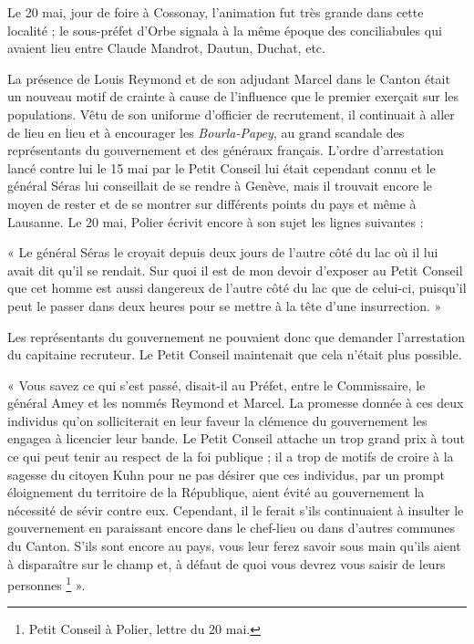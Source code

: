 \documentclass[french,twoside]{book} %
\newenvironment{quoteblock}%
  {\begin{quoting}}
  {\end{quoting}}
\newenvironment{quotebar}{%
    \def\FrameCommand{{\color{rubric!10!}\vrule width 0.5em} \hspace{0.9em}}%
    \def\OuterFrameSep{\itemsep} %
    \MakeFramed {\advance\hsize-\width \FrameRestore}
  }%
  {%
    \endMakeFramed
  }
\renewenvironment{quoteblock}%
  {%
    \savenotes
    \setstretch{0.9}
    \begin{quotebar}
  }
  {%
    \end{quotebar}
    \spewnotes
  }
\begin{document}
\noindent Le 20 mai, jour de foire à Cossonay, l’animation fut très grande dans cette localité ; le sous-préfet d’Orbe signala à la même époque des conciliabules qui avaient lieu entre Claude Mandrot, Dautun, Duchat, etc.\par
La présence de Louis Reymond et de son adjudant Marcel dans le Canton était un nouveau motif de crainte à cause de l’influence que le premier exerçait sur les populations. Vêtu de son uniforme d’officier de recrutement, il continuait à aller de lieu en lieu et à encourager les \emph{Bourla-Papey}, au grand scandale des représentants du gouvernement et des généraux français. L’ordre d’arrestation lancé contre lui le 15 mai par le Petit Conseil lui était cependant connu et le général Séras lui conseillait de se rendre à Genève, mais il trouvait encore le moyen de rester et de se montrer sur différents points du pays et même à Lausanne. Le 20 mai, Polier écrivit encore à son sujet les lignes suivantes :\par

\begin{quoteblock}
 \noindent « Le général Séras le croyait depuis deux jours de l’autre côté du lac où il lui avait dit qu’il se rendait. Sur quoi il est de mon devoir d’exposer au Petit Conseil que cet homme est aussi dangereux de l’autre côté du lac que de celui-ci, puisqu’il peut le passer dans deux heures pour se mettre à la tête d’une insurrection. »
 \end{quoteblock}

\noindent Les représentants du gouvernement ne pouvaient donc que demander l’arrestation du capitaine recruteur. Le Petit Conseil maintenait que cela n’était plus possible.\par

\begin{quoteblock}
 \noindent « Vous savez ce qui s’est passé, disait-il au Préfet, entre le Commissaire, le général Amey et les nommés Reymond et Marcel. La promesse donnée à ces deux individus qu’on solliciterait en leur faveur la clémence du gouvernement les engagea à licencier leur bande. Le Petit Conseil attache un trop grand prix à tout ce qui peut tenir au respect de la foi publique ; il a trop de motifs de croire à la sagesse du citoyen Kuhn pour ne pas désirer que ces individus, par un prompt éloignement du territoire de la République, aient évité au gouvernement la nécessité de sévir contre eux. Cependant, il le ferait s’ils continuaient à insulter le gouvernement en paraissant encore dans le chef-lieu ou dans d’autres communes du Canton. S’ils sont encore au pays, vous leur ferez savoir sous main qu’ils aient à disparaître sur le champ et, à défaut de quoi vous devrez vous saisir de leurs personnes \footnote{Petit Conseil à Polier, lettre du 20 mai.} ».
 \end{quoteblock}
\end{document}
